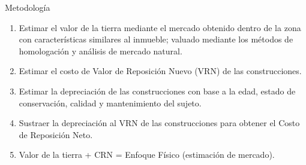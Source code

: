 \textcolor{principal}{Metodolog\'ia}

\begin{enumerate}[1.-]
\item Estimar el valor de la tierra mediante el mercado obtenido dentro de la zona con caracter\'isticas similares al inmueble; valuado mediante los m\'etodos de homologaci\'on y an\'alisis de mercado natural.

\item  Estimar el costo de \textcolor{principal}{Valor de Reposici\'on Nuevo (VRN)} de las construcciones. 

\item  Estimar la depreciaci\'on de las construcciones con base a la edad, estado de conservaci\'on, calidad y mantenimiento del sujeto.

\item Sustraer la depreciación al VRN de las construcciones para obtener el \textcolor{principal}{Costo de Reposici\'on Neto.}

\item Valor de la tierra + CRN  = Enfoque Físico (estimación de mercado).

\end{enumerate}



